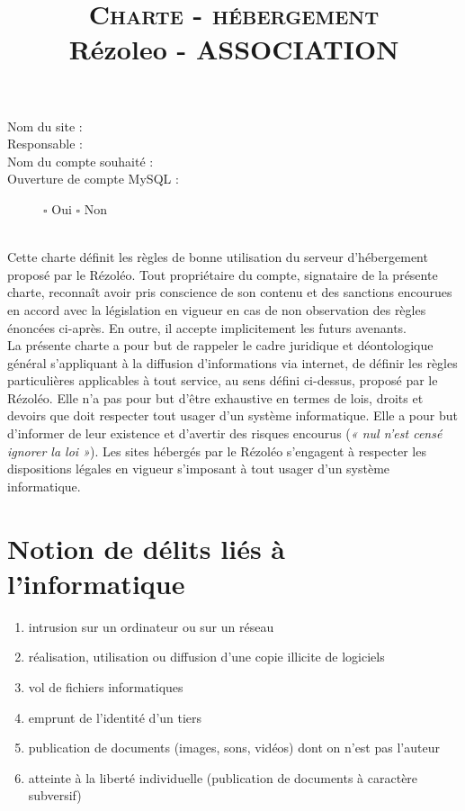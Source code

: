 \documentclass[10pt,a4paper]{article}
\title{{\Huge\textsc{Charte - hébergement}}\\ Rézoleo - ASSOCIATION}
\date{}
\begin{document}
\maketitle
\thispagestyle{fancy}


\hrulefill
\begin{description}
\item[Nom du site :] \dotfill
\item[Responsable :]\dotfill
\item[Nom du compte souhaité :]\dotfill
\item[Ouverture de compte MySQL :] \hspace{1cm} $\square$ Oui \hspace{3cm} $\square$ Non
\end{description}
\hrulefill
\\

Cette charte définit les règles de bonne utilisation du serveur d'hébergement proposé par le Rézoléo. Tout propriétaire du compte, signataire de la présente charte, reconnaît avoir pris conscience de son contenu et des sanctions encourues en accord avec la législation en vigueur en cas de non observation des règles énoncées ci-après. En outre, il accepte implicitement les futurs avenants.\\

La présente charte a pour but de rappeler le cadre juridique et déontologique général s'appliquant à la diffusion d'informations via internet, de définir les règles particulières applicables à tout service, au sens défini ci-dessus, proposé par le Rézoléo. Elle n'a pas pour but d'être exhaustive en termes de lois, droits et devoirs que doit respecter tout usager d'un système informatique. Elle a pour but d'informer de leur existence et d'avertir des risques encourus (\textit{« nul n'est censé ignorer la loi »}). Les sites hébergés par le Rézoléo s'engagent à respecter les dispositions légales en vigueur s'imposant à tout usager d'un système informatique.

\section{Notion de délits liés à l'informatique}
\begin{enumerate}
\item intrusion sur un ordinateur ou sur un réseau
\item réalisation, utilisation ou diffusion d'une copie illicite de logiciels
\item vol de fichiers informatiques
\item emprunt de l'identité d'un tiers
\item publication de documents (images, sons, vidéos) dont on n'est pas l'auteur
\item atteinte à la liberté individuelle (publication de documents à caractère subversif)
\end{enumerate}
\end{document}
